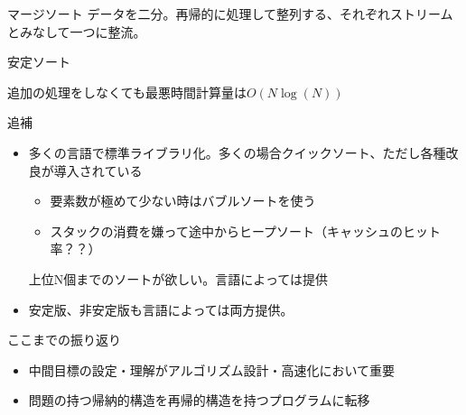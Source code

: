 \documentclass{beamer}
\begin{document}
\begin{frame}[fragile]{マージソート}{}
データを二分。再帰的に処理して整列する、それぞれストリームとみなして一つに整流。

安定ソート

\vfill
追加の処理をしなくても最悪時間計算量は$O(N\log(N))$
\end{frame}

\begin{frame}[fragile]{追補}{}
\begin{itemize}\itemsep8pt
\item 多くの言語で標準ライブラリ化。多くの場合クイックソート、ただし各種改良が導入されている
\begin{itemize}%
\item 要素数が極めて少ない時はバブルソートを使う
\item スタックの消費を嫌って途中からヒープソート（キャッシュのヒット率？？）
\end{itemize}
\vfill 上位N個までのソートが欲しい。言語によっては提供
\item 安定版、非安定版も言語によっては両方提供。
\end{itemize}
\end{frame}

\begin{frame}[fragile]{ここまでの振り返り}{}
\begin{itemize}%
\item 中間目標の設定・理解がアルゴリズム設計・高速化において重要
\item 問題の持つ帰納的構造を再帰的構造を持つプログラムに転移
\end{itemize}
\end{frame}
\end{document}
